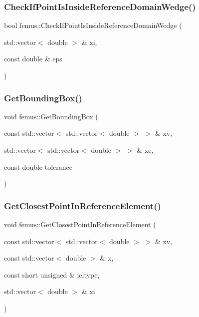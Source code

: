 \mbox{\label{namespacefemus_a3b749091251a9d0500a95f9c7294e427}} 
\subsubsection{\texorpdfstring{Check\+If\+Point\+Is\+Inside\+Reference\+Domain\+Wedge()}{CheckIfPointIsInsideReferenceDomainWedge()}}
{\footnotesize\ttfamily bool femus\+::\+Check\+If\+Point\+Is\+Inside\+Reference\+Domain\+Wedge (\begin{DoxyParamCaption}\item[{std\+::vector$<$ double $>$ \&}]{xi,  }\item[{const double \&}]{eps }\end{DoxyParamCaption})}

\mbox{\label{namespacefemus_ac278a2a73ea84ae1978b3c39ef49cf73}} 
\subsubsection{\texorpdfstring{Get\+Bounding\+Box()}{GetBoundingBox()}}
{\footnotesize\ttfamily void femus\+::\+Get\+Bounding\+Box (\begin{DoxyParamCaption}\item[{const std\+::vector$<$ std\+::vector$<$ double $>$ $>$ \&}]{xv,  }\item[{std\+::vector$<$ std\+::vector$<$ double $>$ $>$ \&}]{xe,  }\item[{const double}]{tolerance }\end{DoxyParamCaption})}

\mbox{\label{namespacefemus_a26952845941ad3ab68f35f0dc647e464}} 
\subsubsection{\texorpdfstring{Get\+Closest\+Point\+In\+Reference\+Element()}{GetClosestPointInReferenceElement()}}
{\footnotesize\ttfamily void femus\+::\+Get\+Closest\+Point\+In\+Reference\+Element (\begin{DoxyParamCaption}\item[{const std\+::vector$<$ std\+::vector$<$ double $>$ $>$ \&}]{xv,  }\item[{const std\+::vector$<$ double $>$ \&}]{x,  }\item[{const short unsigned \&}]{ieltype,  }\item[{std\+::vector$<$ double $>$ \&}]{xi }\end{DoxyParamCaption})}

